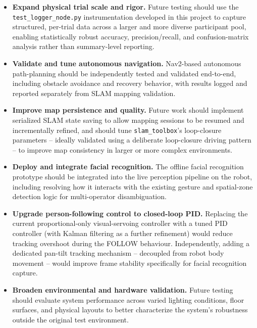\begin{itemize}
  \item \textbf{Expand physical trial scale and rigor.} Future testing should use the
  \texttt{test\_logger\_node.py} instrumentation developed in this project to capture
  structured, per-trial data across a larger and more diverse participant pool,
  enabling statistically robust accuracy, precision/recall, and confusion-matrix
  analysis rather than summary-level reporting.

  \item \textbf{Validate and tune autonomous navigation.} Nav2-based autonomous
  path-planning should be independently tested and validated end-to-end, including
  obstacle avoidance and recovery behavior, with results logged and reported
  separately from SLAM mapping validation.

  \item \textbf{Improve map persistence and quality.} Future work should implement
  serialized SLAM state saving to allow mapping sessions to be resumed and
  incrementally refined, and should tune \texttt{slam\_toolbox}'s loop-closure
  parameters -- ideally validated using a deliberate loop-closure driving pattern --
  to improve map consistency in larger or more complex environments.

  \item \textbf{Deploy and integrate facial recognition.} The offline facial
  recognition prototype should be integrated into the live perception pipeline on the
  robot, including resolving how it interacts with the existing gesture and
  spatial-zone detection logic for multi-operator disambiguation.

 \item \textbf{Upgrade person-following control to closed-loop PID.} Replacing the
current proportional-only visual-servoing controller with a tuned PID controller
(with Kalman filtering as a further refinement) would reduce tracking overshoot
during the FOLLOW behaviour. Independently, adding a dedicated pan-tilt tracking
mechanism -- decoupled from robot body movement -- would improve frame stability
specifically for facial recognition capture.

  \item \textbf{Broaden environmental and hardware validation.} Future testing should
  evaluate system performance across varied lighting conditions, floor surfaces, and
  physical layouts to better characterize the system's robustness outside the original
  test environment.
\end{itemize}

